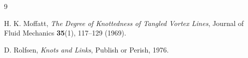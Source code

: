 \documentclass[12pt,a4paper]{article}
\begin{document}
        \begin{thebibliography}{9}
            
            H. K. Moffatt,
            \textit{The Degree of Knottedness of Tangled Vortex Lines},
            Journal of Fluid Mechanics \textbf{35}(1), 117--129 (1969).
            
            D. Rolfsen,
            \textit{Knots and Links},
            Publish or Perish, 1976.
        
        \end{thebibliography}
\end{document}
